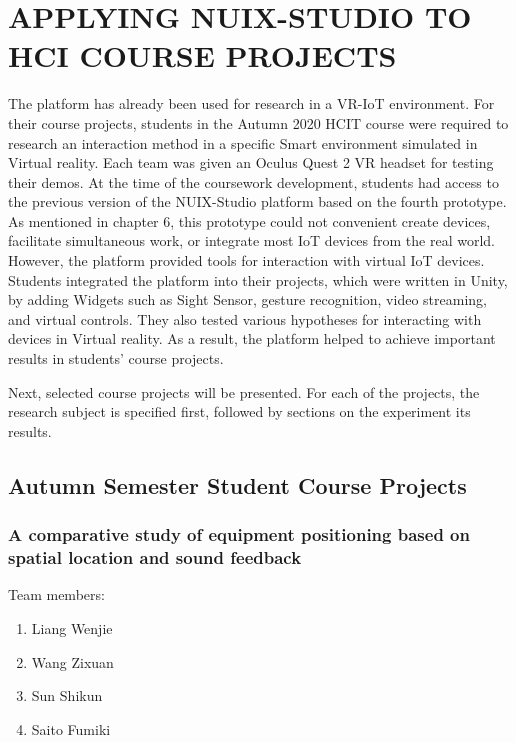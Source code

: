 
\chapter{\MakeUppercase{Applying NUIX-Studio to HCI Course Projects}}

The platform has already been used for research in a VR-IoT environment.
For their course projects, students in the Autumn 2020 HCIT course were required to research an interaction method in a specific Smart environment simulated in Virtual reality. Each team was given an Oculus Quest 2 VR headset for testing their demos. At the time of the coursework development, students had access to the previous version of the NUIX-Studio platform based on the fourth prototype. As mentioned in chapter 6, this prototype could not convenient create devices, facilitate simultaneous work, or integrate most IoT devices from the real world. However, the platform provided tools for interaction with virtual IoT devices. Students integrated the platform into their projects, which were written in Unity, by adding Widgets such as Sight Sensor, gesture recognition, video streaming, and virtual controls. They also tested various hypotheses for interacting with devices in Virtual reality. As a result, the platform helped to achieve important results in students' course projects. 

Next, selected course projects will be presented. For each of the projects, the research subject is specified first, followed by sections on the experiment its results.

\section{Autumn Semester Student Course Projects}

\subsection{A comparative study of equipment positioning based on spatial location and sound feedback}

Team members:
\begin{enumerate}
    \item Liang Wenjie
    \item Wang Zixuan
    \item Sun Shikun
    \item Saito Fumiki
\end{enumerate}

